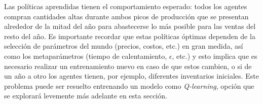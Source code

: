 Las pol\'iticas aprendidas tienen el comportamiento esperado: todos los agentes compran cantidades altas durante ambos picos de producci\'on que se presentan alrededor de la mitad del a\~no para abastecerse lo m\'as posible para las ventas del resto del a\~no. Es importante recordar que estas pol\'iticas \'optimas dependen de la selecci\'on de par\'ametros del mundo (precios, costos, etc.) en gran medida, as\'i como los metapar\'ametros (tiempo de calentamiento, $\epsilon$, etc.) y esto implica que es necesario realizar un entrenamiento nuevo en caso de que estos cambien, o si de un a\~no a otro los agentes tienen, por ejemplo, diferentes inventarios iniciales. Este problema puede ser resuelto entrenando un modelo como \textit{Q-learning}, opci\'on que se explorar\'a levemente m\'as adelante en esta secci\'on.\\

